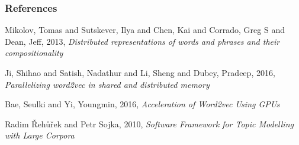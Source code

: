 %
%

\begin{frame} \frametitle{References}
\begin{thebibliography}{xx}\footnotesize

 {\sc Mikolov, Tomas and Sutskever, Ilya and Chen, Kai and Corrado, Greg S and Dean, Jeff}, 2013, {\em Distributed representations of words and phrases and their compositionality }

 {\sc Ji, Shihao and Satish, Nadathur and Li, Sheng and Dubey, Pradeep}, 2016, {\em Parallelizing word2vec in shared and distributed memory}

 {\sc Bae, Seulki
and Yi, Youngmin}, 2016, {\em Acceleration of Word2vec Using GPUs}

 {\sc Radim {\v R}eh{\r u}{\v r}ek and Petr Sojka}, 2010, {\em Software Framework for Topic Modelling with Large Corpora}




\end{thebibliography}
\end{frame}